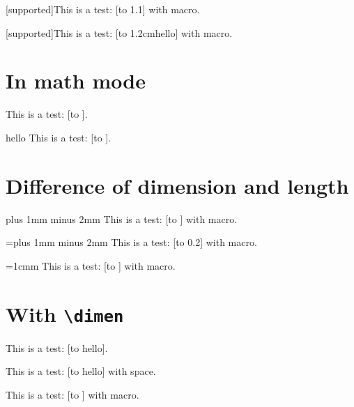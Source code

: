 \documentclass{revtex4-1}
\def\Supported{{\color{darkgreen} [supported]}}
\begin{document}
\def\A{.1}
\Supported This is a test: [\hbox to 1\A\textwidth {hello}] with macro. %

\def\A{m}
\Supported This is a test: [\hbox to 1.2c\A {hello}] with macro. %


\section{In math mode}
This is a test: [\hbox to ]. %


h\!e\!l\!l\!o
This is a test: [\hbox to ].



\section{Difference of dimension and length}

\newlength\myheight
\myheight=1cm plus 1mm minus 2mm %
This is a test: [\hbox to ] with macro. %

\textwidth=\textwidth plus 1mm minus 2mm %
This is a test: [\hbox to 0.2\textwidth {hello}] with macro. %

\myheight=1cmm %
This is a test: [\hbox to ] with macro. %


\section{With \texttt{\textbackslash dimen}}

This is a test: [\hbox to  {hello}]. %


This is a test: [\hbox to  {hello}] with space. %

\def\hello{100}
This is a test: [\hbox to \dimen \hello {hello}] with macro. %
\end{document}
